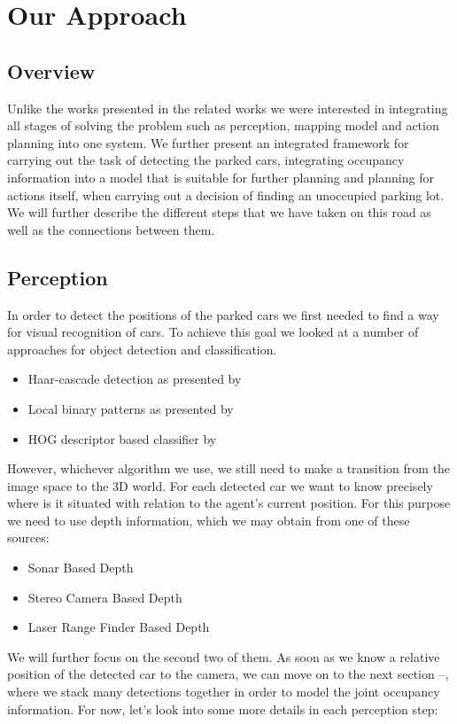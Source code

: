 \chapter{Our Approach}
\label{cha:our_approach}

\section{Overview} %
\label{sec:overview}
Unlike the works presented in the related works we were interested in integrating all stages of solving the problem such as perception, mapping model and action planning into one system. We further present an integrated framework for carrying out the task of detecting the parked cars, integrating occupancy information into a model that is suitable for further planning and planning for actions itself, when carrying out a decision of finding an unoccupied parking lot.
We will further describe the different steps that we have taken on this road as well as the connections between them.

\section{Perception} %
\label{sec:perception}
    In order to detect the positions of the parked cars we first needed to find a way for visual recognition of cars. To achieve this goal we looked at a number of approaches for object detection and classification.
    \begin{itemize}
        \item Haar-cascade detection as presented by\cite{violajones2001}
        \item Local binary patterns as presented by 
        \item HOG descriptor based classifier by\cite{dalal2005}
    \end{itemize}
    However, whichever algorithm we use, we still need to make a transition from the image space to the 3D world. For each detected car we want to know precisely where is it situated with relation to the agent's current position.
    For this purpose we need to use depth information, which we may obtain from one of these sources:
    \begin{itemize}
        \item Sonar Based Depth
        \item Stereo Camera Based Depth
        \item Laser Range Finder Based Depth
    \end{itemize}
    We will further focus on the second two of them.
    As soon as we know a relative position of the detected car to the camera, we can move on to the next section --, where we stack many detections together in order to model the joint occupancy information.
    For now, let's look into some more details in each perception step:
